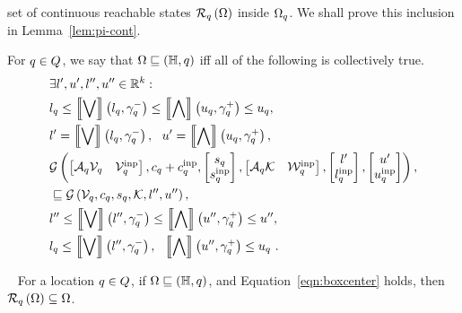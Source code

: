 set of continuous reachable states $\mathcal{R}_{q}\left(\Omega\right)$ inside
$\Omega_q$.  We shall prove this inclusion in
Lemma~\ref{lem:pi-cont}.
%
\begin{definition}
  For $q\in Q$, we say that
  $\Omega\sqsubseteq\left(\mathbb{H},q\right)$ iff  all of the following is
  collectively true.
%
\begin{align}
& \exists l^\prime,u^\prime,l^{\prime\prime},u^{\prime\prime}\in\mathbb{R}^k:\nonumber\\
& l_q\leq\left\llbracket\bigvee\right\rrbracket\left(l_q,\gamma_q^-\right)\leq\left\llbracket\bigwedge\right\rrbracket\left(u_q,\gamma_q^+\right)\leq u_{q},~\label{eqn:continv1}\\
& l^\prime= \left\llbracket\bigvee\right\rrbracket\left(l_q,\gamma_q^-\right),~~u^\prime= \left\llbracket\bigwedge\right\rrbracket\left(u_q,\gamma_q^+\right),~\label{eqn:continv2}\\
& \mathcal{G}\left(
\left[\begin{matrix}\mathcal{A}_q\mathcal{V}_q & \mathcal{V}^{\operatorname{inp}}_q\end{matrix}\right]
,
c_q+c^{\operatorname{inp}}_q
,
\left[\begin{matrix}s_q\\ s^{\operatorname{inp}}_q\end{matrix}\right]
,
\left[\begin{matrix}\mathcal{A}_q\mathcal{K} & \mathcal{W}^{\operatorname{inp}}_q\end{matrix}\right]
,
\left[\begin{matrix}l^\prime\\l^{\operatorname{inp}}_q\end{matrix}\right]
,
\left[\begin{matrix}u^\prime\\ u^{\operatorname{inp}}_q\end{matrix}\right]
\right),\nonumber\\
& \sqsubseteq 
\mathcal{G}\left(\mathcal{V}_q,c_q,s_q,\mathcal{K},l^{\prime\prime},u^{\prime\prime}\right),~\label{eqn:continv3}\\
&
l^{\prime\prime}\leq\left\llbracket\bigvee\right\rrbracket\left(l^{\prime\prime},\gamma_q^-\right)\leq\left\llbracket\bigwedge\right\rrbracket\left(u^{\prime\prime},\gamma_q^+\right)\leq u^{\prime\prime},~\label{eqn:continv4}\\
& l_q\leq\left\llbracket\bigvee\right\rrbracket\left(l^{\prime\prime},\gamma_q^-\right),~~\left\llbracket\bigwedge\right\rrbracket\left(u^{\prime\prime},\gamma_q^+\right)\leq u_q~\label{eqn:continv5}.
\end{align}
%
\end{definition}
%
\begin{lemma}~\label{lem:pi-cont}
For a location $q\in Q$, if $\Omega\sqsubseteq\left(\mathbb{H},q\right)$, and
Equation~\ref{eqn:boxcenter} holds, then
$\mathcal{R}_{q}\left(\Omega\right)\subseteq\Omega$.
\end{lemma}
%
